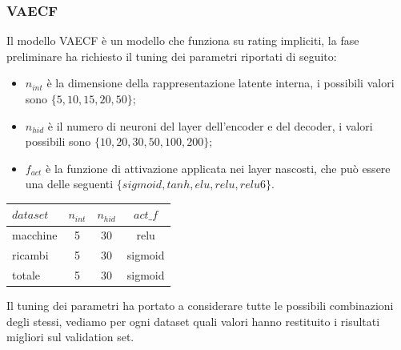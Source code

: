 \subsubsection{VAECF}
Il modello VAECF è un modello che funziona su rating impliciti, la fase preliminare ha richiesto il tuning dei parametri riportati di seguito:
\begin{itemize}
    \item $n_{int}$ è la dimensione della rappresentazione latente interna, i possibili valori sono $\{5,10,15,20,50\}$;
    \item $n_{hid}$ è il numero di neuroni del layer dell'encoder e del decoder, i valori possibili sono $\{10,20,30,50,100,200\}$;
    \item $f_{act}$ è la funzione di attivazione applicata nei layer nascosti, che può essere una delle seguenti $\{sigmoid, tanh, elu, relu, relu6\}$.
\end{itemize}
\begin{minipage}[H]{0.45\textwidth}
    \begin{center}
        \begin{tabular}{|l|ccc|}
            \toprule
            $dataset$ &    $n_{int}$ &  $n_{hid}$ & $act\_f$ \\
            \midrule
            macchine & 5 & 30 & relu \\
            ricambi  &	5 & 30 & sigmoid\\
            totale  & 5 & 30 & sigmoid\\
        \bottomrule
        \end{tabular}
        \label{tab:tuning_vaecf}
\end{center}
\end{minipage}
\begin{minipage}[H]{0.55\textwidth}
    Il tuning dei parametri ha portato a considerare tutte le possibili combinazioni degli stessi, vediamo per ogni dataset quali valori hanno restituito i risultati migliori sul validation set.
\end{minipage}\\

